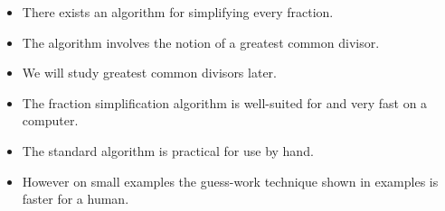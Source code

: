 \begin{frame}
\begin{itemize}
\item There exists an algorithm for simplifying every fraction. 
\item<2-> The algorithm involves the notion of a greatest common divisor.
\item<3-> We will study greatest common divisors later.
\item<4-> The fraction simplification algorithm is well-suited for and very fast on a computer. 
\item<5-> The standard algorithm is practical for use by hand.
\item<6-> However on small examples the guess-work technique shown in examples is faster for a human.
\end{itemize}
\end{frame}